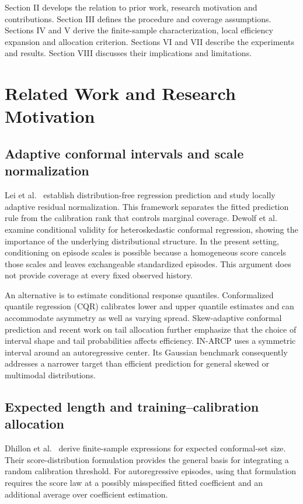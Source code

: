\documentclass[nolineno]{ieeeaccess}
\begin{document}
Section II develops the relation to prior work, research motivation and contributions. Section III defines the procedure and coverage assumptions. Sections IV and V derive the finite-sample characterization, local efficiency expansion and allocation criterion. Sections VI and VII describe the experiments and results. Section VIII discusses their implications and limitations.

\section{Related Work and Research Motivation}
\subsection{Adaptive conformal intervals and scale normalization}
Lei et al.~\cite{lei2018} establish distribution-free regression prediction and study locally adaptive residual normalization. This framework separates the fitted prediction rule from the calibration rank that controls marginal coverage. Dewolf et al.~\cite{dewolf2024} examine conditional validity for heteroskedastic conformal regression, showing the importance of the underlying distributional structure. In the present setting, conditioning on episode scales is possible because a homogeneous score cancels those scales and leaves exchangeable standardized episodes. This argument does not provide coverage at every fixed observed history.

An alternative is to estimate conditional response quantiles. Conformalized quantile regression (CQR) \cite{romano2019} calibrates lower and upper quantile estimates and can accommodate asymmetry as well as varying spread. Skew-adaptive conformal prediction \cite{marques2026} and recent work on tail allocation \cite{wang2026} further emphasize that the choice of interval shape and tail probabilities affects efficiency. IN-ARCP uses a symmetric interval around an autoregressive center. Its Gaussian benchmark consequently addresses a narrower target than efficient prediction for general skewed or multimodal distributions.

\subsection{Expected length and training--calibration allocation}
Dhillon et al.~\cite{dhillon2024} derive finite-sample expressions for expected conformal-set size. Their score-distribution formulation provides the general basis for integrating a random calibration threshold. For autoregressive episodes, using that formulation requires the score law at a possibly misspecified fitted coefficient and an additional average over coefficient estimation.
\end{document}
